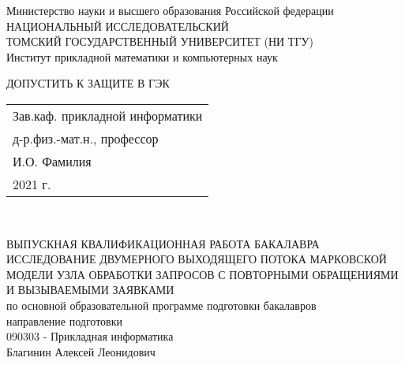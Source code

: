 	\begin{center}\linespread{1}
		\hfill \break
		\large{Министерство науки и высшего образования Российской федерации}\\
		\footnotesize{НАЦИОНАЛЬНЫЙ ИССЛЕДОВАТЕЛЬСКИЙ}\\ 
		\footnotesize{ТОМСКИЙ ГОСУДАРСТВЕННЫЙ УНИВЕРСИТЕТ (НИ ТГУ)}\\
		\footnotesize{Институт прикладной математики и компьютерных наук}\\
		\hfill\break
		\hfill \break
	\end{center}
\begin{flushright}\linespread{0.9}
	\normalsize{ДОПУСТИТЬ К ЗАЩИТЕ В ГЭК}\\ 
	\hfill \break
	\normalsize{ 
		\begin{tabular}{@{}l@{}}
			Зав.каф. прикладной информатики\\  д-р.физ.-мат.н.,  профессор\\ \underline{\hspace{2cm}} И.О. Фамилия\\
			\textquote{\underline{\hspace{0.7cm}}}\underline{\hspace{2cm}}2021 г.	
		\end{tabular}	
	}\\
\end{flushright}
\hfill \break
\hfill \break
\hfill \break
\begin{center}\linespread{1}
		\large{ВЫПУСКНАЯ КВАЛИФИКАЦИОННАЯ РАБОТА БАКАЛАВРА}\\
		\hfill \break
		\large{ИССЛЕДОВАНИЕ ДВУМЕРНОГО ВЫХОДЯЩЕГО ПОТОКА МАРКОВСКОЙ МОДЕЛИ УЗЛА ОБРАБОТКИ ЗАПРОСОВ С ПОВТОРНЫМИ ОБРАЩЕНИЯМИ И ВЫЗЫВАЕМЫМИ ЗАЯВКАМИ}\\
		\hfill \break
		\hfill \break
		\normalsize{по основной образовательной программе подготовки бакалавров\\
			направление  подготовки\\
			090303 - Прикладная информатика\\
		\hfill \break
	Благинин Алексей Леонидович}\\
		\hfill \break
		\hfill \break
	\end{center}
